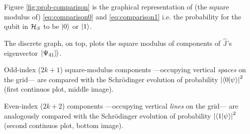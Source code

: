Figure \ref{fig:prob-comparison} is the graphical representation of (the square modulus of)
\eqref{eq:comparison0} and \eqref{eq:comparison1} i.e. the probability for the qubit
in $\mathcal{H}_S$ to be $\ket{0}$ or $\ket{1}$.

The discrete graph, on top, plots the
square modulus of components of $\hat{\mathbb{J}}$'s eigenvector $\left.\left| \Psi_{41} \right\rangle\hspace{-0.115em}\right\rangle$.

Odd-index ($2k+1$) square-modulus components
---occupying vertical \emph{spaces} on the grid---
are compared
with the Schr{\"o}dinger evolution of probability $\qty|\braket{0}{\psi}|^{2}$
(first continuos plot, middle image).

Even-index ($2k+2$) components
---occupying vertical \emph{lines} on the grid---
are analogously compared
with the Schr{\"o}dinger evolution of probability $\qty|\braket{1}{\psi}|^{2}$
(second continuos plot, bottom image).

